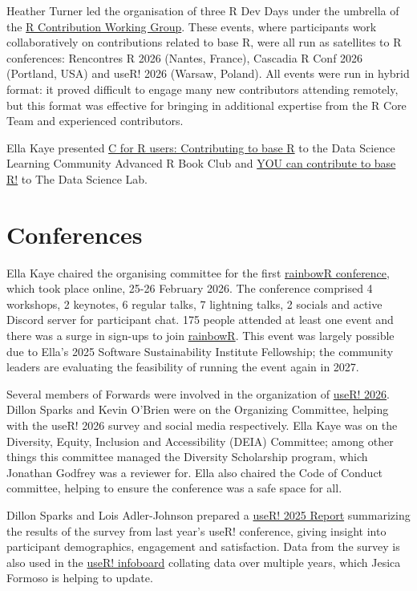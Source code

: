 Heather Turner led the organisation of three R Dev Days under the umbrella of the
\href{https://contributor.r-project.org/working-group}{R Contribution Working Group}.
These events, where participants work collaboratively on contributions
related to base R, were all run as satellites to R conferences:
Rencontres R 2026 (Nantes, France), Cascadia R Conf 2026 (Portland, USA) and
useR! 2026 (Warsaw, Poland). All events were run in hybrid format: it proved difficult
to engage many new contributors attending remotely, but this format
was effective for bringing in additional expertise from the R Core Team and
experienced contributors.

Ella Kaye presented \href{https://youtu.be/5SUzFMOrmHk}{C for R users: Contributing to base R}
to the Data Science Learning Community Advanced R Book Club and \href{https://opensource.posit.co/resources/videos/2026-05-18_you-can-contribute-to-base-r-ella-kaye-data-science-lab/}{YOU can contribute to base R!} to The Data Science Lab.

\section{Conferences}\label{conferences}

Ella Kaye chaired the organising committee for the first \href{https://conference.rainbowr.org}{rainbowR conference}, which took place online,
25-26 February 2026. The conference comprised 4 workshops, 2 keynotes,
6 regular talks, 7 lightning talks, 2 socials and active Discord server for
participant chat. 175 people attended at least one event and there was
a surge in sign-ups to join \href{https://rainbowr.org/}{rainbowR}.
This event was largely possible due to Ella's
2025 Software Sustainability Institute Fellowship; the community leaders are
evaluating the feasibility of running the event again in 2027.

Several members of Forwards were involved in the organization of \href{https://user2026.r-project.org}{useR! 2026}. Dillon Sparks and Kevin O'Brien were
on the Organizing Committee, helping with the useR! 2026 survey and social media
respectively. Ella Kaye was on the Diversity, Equity, Inclusion and Accessibility (DEIA) Committee; among other things this committee managed the Diversity Scholarship program,
which Jonathan Godfrey was a reviewer for. Ella also chaired the Code of Conduct
committee, helping to ensure the conference was a safe space for all.

Dillon Sparks and Lois Adler-Johnson prepared a \href{https://forwards.github.io/docs/useR2025_survey/}{useR! 2025 Report} summarizing the
results of the survey from last year's useR! conference, giving insight into
participant demographics, engagement and satisfaction. Data from the survey is
also used in the \href{https://rconf.gitlab.io/userinfoboard/}{useR! infoboard}
collating data over multiple years, which Jesica Formoso is helping to update.

